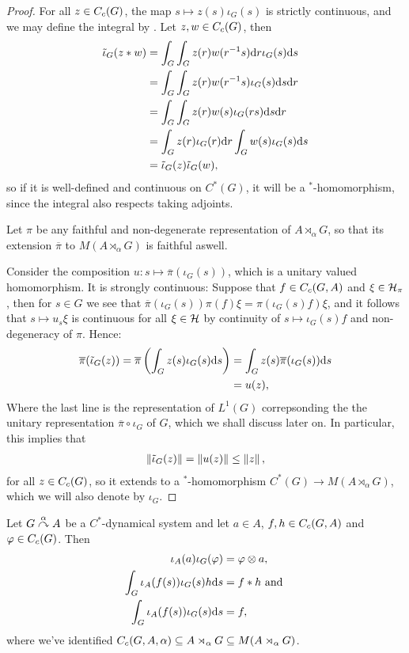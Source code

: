 \begin{proof}
For all $z \in C_c(G)$, the map $s \mapsto z(s) \iota_G(s)$ is strictly continuous, and we may define the integral by . Let $z,w \in C_c(G)$, then
\begin{align*}
	\tilde \iota_G(z \ast w) &= \int_G \int_G z(r)w(r^{-1}s) \mathrm{d} r \iota_G(s) \mathrm{d} s \\
	&= \int_G \int_G z(r) w(r^{-1}s) \iota_G(s) \mathrm{d} s \mathrm{d} r\\
	&= \int_G \int_G z(r) w(s) \iota_G(rs) \mathrm{d} s \mathrm{d} r\\
	&= \int_G z(r) \iota_G(r) \mathrm{d} r \int_G w(s) \iota_G(s) \mathrm{d} s \\
	&= \tilde \iota_G(z) \tilde \iota_G(w),
\end{align*}
so if it is well-defined and continuous on $C^*(G)$, it will be a $^*$-homomorphism, since the integral also respects taking adjoints. 

Let $\pi$ be any faithful and non-degenerate representation of $A \rtimes_\alpha G$, so that its extension $\overline \pi $ to $M(A \rtimes_ \alpha G)$ is faithful aswell.

Consider the composition $u \colon s \mapsto \overline{\pi}( \iota_G(s))$, which is a unitary valued homomorphism. It is strongly continuous: Suppose that $f \in C_c(G,A)$ and $\xi \in \mathcal{H}_\pi$, then for $s \in G$ we see that $\overline{ \pi} (\iota_G(s)) \pi(f) \xi = \pi(\iota_G(s) f) \xi$, and it follows that  $s \mapsto u_s \xi$ is continuous for all $\xi \in \mathcal{H}$ by continuity of $s \mapsto \iota_G(s)f$ and non-degeneracy of $\pi$. Hence:
\begin{align*}
\overline \pi(\tilde \iota_G(z)) = \overline \pi \left(  \int_G z(s) \iota_G(s) \mathrm{d} s \right) &=\int_G z(s) \overline \pi(\iota_G(s)) \mathrm{d} s \\
&= u(z),
\end{align*}
Where the last line is the representation of $L^1(G)$ correpsonding the the unitary representation $\overline \pi \circ \iota_G$ of $G$, which we shall discuss later on. In particular, this implies that
\begin{align}
	\left\lVert \tilde \iota_G(z)\right\rVert = \left\lVert u(z)\right\rVert \leq \left\lVert z \right\rVert,
\end{align}
for all $z \in C_c(G)$, so it extends to a $^*$-homomorphism $C^*(G) \to M(A \rtimes_\alpha G)$, which we will also denote by $\iota_G$.
\end{proof}
\begin{corollary}
Let $G \stackrel{\alpha}{\curvearrowright} A$ be a $C^*$-dynamical system and let $a \in A$, $f,h \in C_c(G,A)$ and $\varphi \in C_c(G)$. Then
\begin{align*}
\iota_A(a) \iota_G(\varphi) &= \varphi \otimes a,\\
\int_G \iota_A(f(s)) \iota_G(s)h  \mathrm{d} s &= f \ast h \text{ and }\\
\int_G \iota_A(f(s)) \iota_G(s) \mathrm{d} s & = f,
\end{align*}
where we've identified $C_c(G,A,\alpha) \subseteq A \rtimes_\alpha G \subseteq M(A \rtimes_\alpha G)$.
\label{cross:iotaresults}
\end{corollary}

